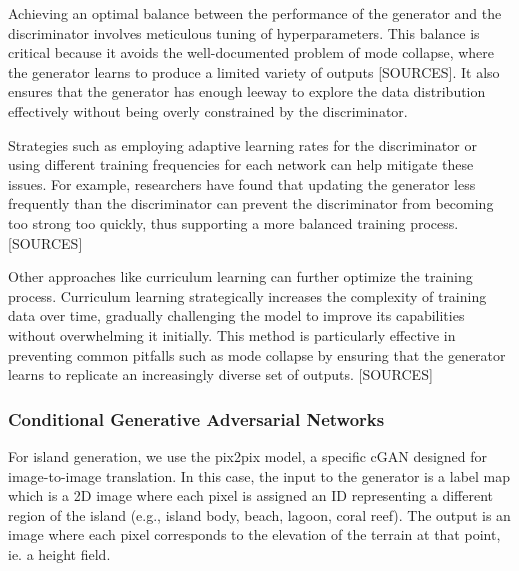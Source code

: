 Achieving an optimal balance between the performance of the generator and the discriminator involves meticulous tuning of hyperparameters. This balance is critical because it avoids the well-documented problem of mode collapse, where the generator learns to produce a limited variety of outputs [SOURCES]. It also ensures that the generator has enough leeway to explore the data distribution effectively without being overly constrained by the discriminator.

Strategies such as employing adaptive learning rates for the discriminator or using different training frequencies for each network can help mitigate these issues. For example, researchers have found that updating the generator less frequently than the discriminator can prevent the discriminator from becoming too strong too quickly, thus supporting a more balanced training process. [SOURCES]

Other approaches like curriculum learning can further optimize the training process. Curriculum learning strategically increases the complexity of training data over time, gradually challenging the model to improve its capabilities without overwhelming it initially. This method is particularly effective in preventing common pitfalls such as mode collapse by ensuring that the generator learns to replicate an increasingly diverse set of outputs. [SOURCES]



\subsubsection{Conditional Generative Adversarial Networks}
\label{sec:coral-island_sota-cGAN}

For island generation, we use the pix2pix model, a specific cGAN designed for image-to-image translation. In this case, the input to the generator is a label map which is a 2D image where each pixel is assigned an ID representing a different region of the island (e.g., island body, beach, lagoon, coral reef). The output is an image where each pixel corresponds to the elevation of the terrain at that point, ie. a height field.



